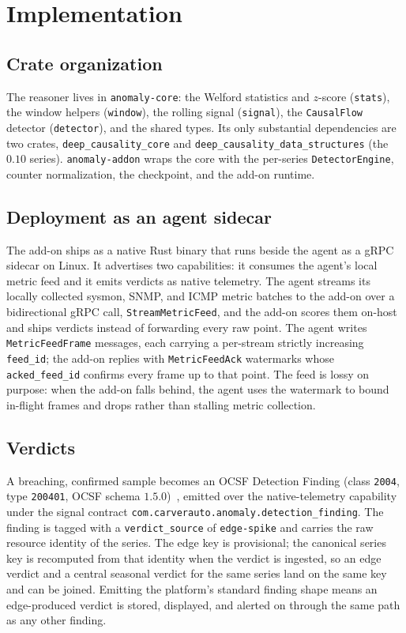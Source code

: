 \section{Implementation}
\label{sec:impl}

\subsection{Crate organization}
The reasoner lives in \texttt{anomaly-core}: the Welford statistics and $z$-score
(\texttt{stats}), the window helpers (\texttt{window}), the rolling signal
(\texttt{signal}), the \texttt{CausalFlow} detector (\texttt{detector}), and the
shared types. Its only substantial dependencies are two \dc{} crates,
\texttt{deep\_\allowbreak causality\_\allowbreak core} and
\texttt{deep\_\allowbreak causality\_\allowbreak data\_\allowbreak structures}
(the $0.10$ series). \texttt{anomaly-addon} wraps the core with the per-series
\texttt{DetectorEngine}, counter normalization, the checkpoint, and the add-on
runtime.

\subsection{Deployment as an agent sidecar}
The add-on ships as a native Rust binary that runs beside the agent as a gRPC
sidecar on Linux. It advertises two capabilities: it consumes the agent's local
metric feed and it emits verdicts as native telemetry. The agent streams its
locally collected sysmon, SNMP, and ICMP metric batches to the add-on over a
bidirectional gRPC call, \texttt{StreamMetricFeed}, and the add-on scores them
on-host and ships verdicts instead of forwarding every raw point. The agent writes
\texttt{MetricFeedFrame} messages, each carrying a per-stream strictly increasing
\texttt{feed\_id}; the add-on replies with \texttt{MetricFeedAck} watermarks whose
\texttt{acked\_feed\_id} confirms every frame up to that point. The feed is lossy on
purpose: when the add-on falls behind, the agent uses the watermark to bound
in-flight frames and drops rather than stalling metric collection.

\subsection{Verdicts}
A breaching, confirmed sample becomes an OCSF Detection Finding (class
\texttt{2004}, type \texttt{200401}, OCSF schema $1.5.0$)~\citep{ocsf}, emitted over
the native-telemetry capability under the signal contract
\texttt{com.carverauto.anomaly.detection\_finding}. The finding is tagged with a
\texttt{verdict\_source} of \texttt{edge-spike} and carries the raw resource
identity of the series. The edge key is provisional; the canonical series key is
recomputed from that identity when the verdict is ingested, so an edge verdict and a
central seasonal verdict for the same series land on the same key and can be joined. Emitting the platform's standard finding shape means an
edge-produced verdict is stored, displayed, and alerted on through the same path as
any other finding.

